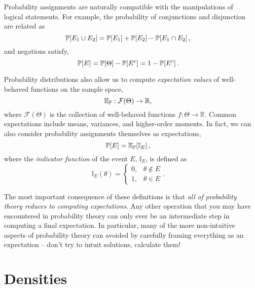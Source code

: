 Probability assignments are naturally compatible with the manipulations
of logical statements.  For example, the probability of conjunctions and
disjunction are related as
%
\begin{equation*}
\mathbb{P} \! \left[ E_{1} \cup E_{2} \right]
= 
\mathbb{P} \! \left[ E_{1} \right] + \mathbb{P} \! \left[ E_{2} \right] 
- \mathbb{P} \! \left[ E_{1} \cap E_{2} \right],
\end{equation*}
%
and negations satisfy,
%
\begin{equation*}
\mathbb{P} \! \left[ E \right] 
= 
\mathbb{P} \! \left[ \Theta \right] - \mathbb{P} \! \left[ E^{c} \right]
=
1 - \mathbb{P} \! \left[ E^{c} \right].
\end{equation*}

Probability distributions also allow us to compute \emph{expectation values} 
of well-behaved functions on the sample space,
%
\begin{equation*}
\mathbb{E}_{\mathbb{P}} : \mathcal{F} \! \left( \Theta \right) \rightarrow \mathbb{R},
\end{equation*}
%
where $\mathcal{F} \! \left( \Theta \right)$ is the collection of well-behaved 
functions $f : \Theta \rightarrow \mathbb{R}$.  Common expectations 
include means, variances, and higher-order moments.  In fact, we
can also consider probability assignments themselves as expectations,
%
\begin{equation*}
\mathbb{P} \! \left[ E \right] = \mathbb{E}_{\mathbb{P}} \! \left[ \mathbb{I}_{E} \right],
\end{equation*}
%
where the \emph{indicator function} of the event $E$, $\mathbb{I}_{E}$,
is defined as
%
\begin{equation*}
\mathbb{I}_{E} \! \left( \theta \right)
= 
\left\{
\begin{array}{rr}
0, & \theta \notin E \\
1, & \theta \in E
\end{array}
\right. .
\end{equation*}

The most important consequence of these definitions is that \emph{all of 
probability theory reduces to computing expectations}.  Any other operation 
that you may have encountered in probability theory can only ever be an
intermediate step in computing a final expectation.  In particular, many of 
the more non-intuitive aspects of probability theory can avoided by carefully
framing everything as an expectation -- don't try to intuit solutions, calculate 
them!

\section{Densities}

